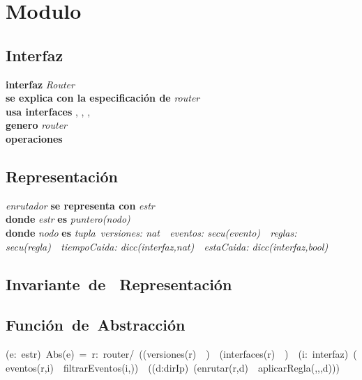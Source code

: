 \section*{Modulo }

\vspace{22pt}

\subsection*{Interfaz}
\textbf{interfaz} \textit{Router}\\
\textbf{se explica con la especificaci\'on de} \textit{router}\\
\textbf{usa interfaces} , , 		, \\
\textbf{genero} \textit{router}\\
\textbf{operaciones}\\

\subsection*{Representaci\'on}
\textit{enrutador} \textbf{se representa con} \textit{estr}\\
\textbf{donde} \textit{estr} \textbf{es} \textit{puntero(nodo)}\\
\textbf{donde} \textit{nodo} \textbf{es} \textit{tupla\langle\ versiones: nat\ 	\times\ eventos: secu(evento)\ \times\ reglas: secu(regla)\ \times\ tiempoCaida: dicc(interfaz,nat)\ \times\ estaCaida: dicc(interfaz,bool)\rangle}\\

\subsection*{Invariante\ de \ Representaci\'on}
\vspace{11pt}
\vspace{33pt}

\subsection*{Funci\'on\ de\ Abstracci\'on}
\vspace{11pt}
(\forall e:\ estr)\ Abs(e)\ =\ r:\ router/\ ((versiones(r)\ \igobs\ )\ \wedge\ (interfaces(r)\ \igobs\ )\ \wedge\ (\forall i:\ interfaz)\ (eventos(r,i)\ \igobs\ filtrarEventos(i,))\ \yluego\ ((\forall d:dirIp)\ (enrutar(r,d)\ \igobs\ aplicarRegla(,,,d)))

